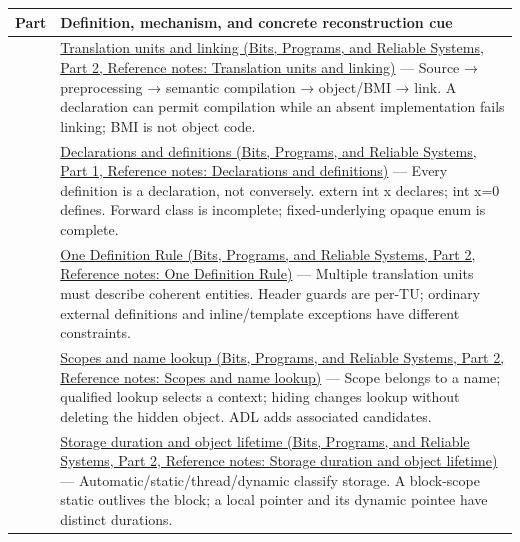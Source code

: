 {\def\LTcaptype{none} %
\begin{longtable}[]{@{}
  >{\raggedright\arraybackslash}p{}
  >{\raggedright\arraybackslash}p{}@{}}
\toprule\noalign{}
\begin{minipage}[b]{\linewidth}\raggedright
Part
\end{minipage} & \begin{minipage}[b]{\linewidth}\raggedright
Definition, mechanism, and concrete reconstruction cue
\end{minipage} \\
\midrule\noalign{}
\endhead
\bottomrule\noalign{}
\endlastfoot
101 & \href{../01-Bits-Programs-and-Reliable-Systems-P02/main.pdf\#nameddest=appendix-806686359e1b}{Translation units and linking (Bits, Programs, and Reliable Systems, Part 2, Reference notes: Translation units and linking)} --- Source → preprocessing → semantic compilation → object/BMI → link. A declaration can permit compilation while an absent implementation fails linking; BMI is not object code. \\
102 & \href{../01-Bits-Programs-and-Reliable-Systems-P01/main.pdf\#nameddest=appendix-2e4d494c2d94}{Declarations and definitions (Bits, Programs, and Reliable Systems, Part 1, Reference notes: Declarations and definitions)} --- Every definition is a declaration, not conversely. extern int x declares; int x=0 defines. Forward class is incomplete; fixed-underlying opaque enum is complete. \\
103 & \href{../01-Bits-Programs-and-Reliable-Systems-P02/main.pdf\#nameddest=appendix-49d27bc9d9a5}{One Definition Rule (Bits, Programs, and Reliable Systems, Part 2, Reference notes: One Definition Rule)} --- Multiple translation units must describe coherent entities. Header guards are per-TU; ordinary external definitions and inline/template exceptions have different constraints. \\
104 & \href{../01-Bits-Programs-and-Reliable-Systems-P02/main.pdf\#nameddest=appendix-b12b31759da1}{Scopes and name lookup (Bits, Programs, and Reliable Systems, Part 2, Reference notes: Scopes and name lookup)} --- Scope belongs to a name; qualified lookup selects a context; hiding changes lookup without deleting the hidden object. ADL adds associated candidates. \\
105 & \href{../01-Bits-Programs-and-Reliable-Systems-P02/main.pdf\#nameddest=appendix-0b104bcba06b}{Storage duration and object lifetime (Bits, Programs, and Reliable Systems, Part 2, Reference notes: Storage duration and object lifetime)} --- Automatic/static/thread/dynamic classify storage. A block-scope static outlives the block; a local pointer and its dynamic pointee have distinct durations. \\

\end{longtable}}
